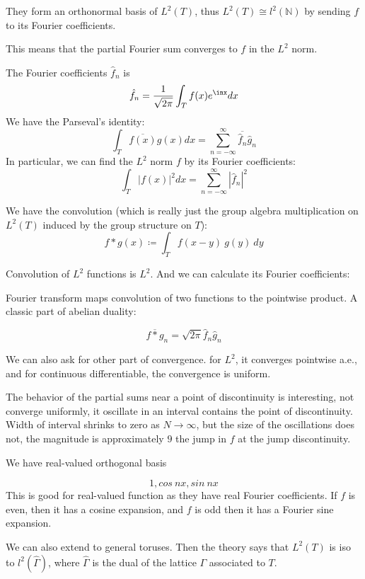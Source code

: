 \documentclass[main.tex]{subfiles}
\begin{document}
\begin{theorem}
They form an orthonormal basis of $L^2(T)$, thus $L^2(T) \cong l^2(\mathbb{N})$ by sending $f$ to its Fourier coefficients.
\end{theorem}

This means that the partial Fourier sum converges to $f$ in the $L^2$ norm. 

The Fourier coefficients $\hat{f}_n$ is 
$$
\hat{f}_n = \frac{1}{\sqrt{2 \pi}} \int_T f(x) e^{\inx} dx
$$
We have the Parseval's identity:
$$
\int_T \overline{f(x)} g(x) dx = \sum_{n = -\infty} ^{\infty} \overline{\hat{f}_n} \hat{g}_n
$$
In particular, we can find the $L^2$ norm $f$ by its Fourier coefficients:
$$
\int_T |f(x)|^2 dx = \sum_{n = -\infty} ^{\infty} |\hat{f}_n|^2
$$

We have the convolution (which is really just the group algebra multiplication on $L^2(T)$ induced by the group structure on $T$):
$$
f * g(x) \coloneqq \int_T f(x-y)\ g(y)\  dy
$$

Convolution of $L^2$ functions is $L^2$. And we can calculate its Fourier coefficients:

Fourier transform maps convolution of two functions to the pointwise product. A classic part of abelian duality:
\begin{theorem}
$$
\overline{f * g}_n = \sqrt{2\pi} \hat{f}_n \hat{g}_n
$$
\end{theorem}

We can also ask for other part of convergence. for $L^2$, it converges pointwise a.e., and for continuous differentiable, the convergence is uniform.

The behavior of the partial sums near a point of discontinuity is interesting, not converge uniformly, it oscillate in an interval contains the point of discontinuity. Width of interval shrinks to zero as $N \rightarrow \infty$, but the size of the oscillations does not, the magnitude is approximately $9$ the jump in $f$ at the jump discontinuity.

We have real-valued orthogonal basis 

$$
1, cos\ nx, sin\ nx
$$
This is good for real-valued function as they have real Fourier coefficients. If $f$ is even, then it has a cosine expansion, and $f$ is odd then it has a Fourier sine expansion.

We can also extend to general toruses. Then the theory says that $L^2(T)$ is iso to $l^2(\hat{\Gamma})$, where $\hat{\Gamma}$ is the dual of the lattice $\Gamma$ associated to $T$.
\end{document}
